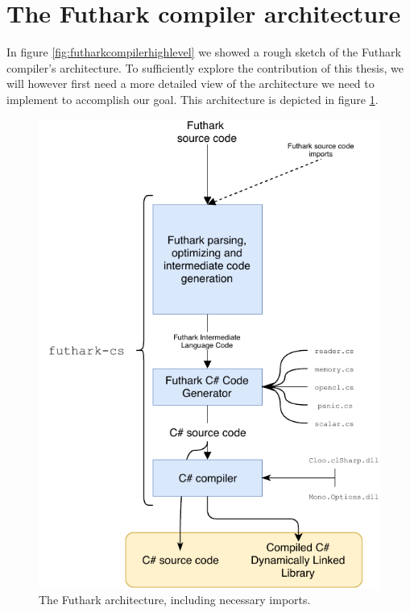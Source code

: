 \clearpage









\section{The Futhark \csharp{} compiler architecture}
In figure \ref{fig:futharkcompilerhighlevel} we showed a rough sketch of the
Futhark compiler's architecture. To sufficiently explore the contribution of
this thesis, we will however first need a more detailed view of the architecture
we need to implement to accomplish our goal.
This architecture is depicted in figure \ref{fig:futharkcompilerlowerlevel}.

\begin{figure}[H]
  \centering
  \includegraphics[scale=0.85]{chapters/figs/csharp/futharkcsarchitecture.pdf}
  \caption{The Futhark \csharp{} architecture, including necessary imports.}
  \label{fig:futharkcompilerlowerlevel}
\end{figure}

